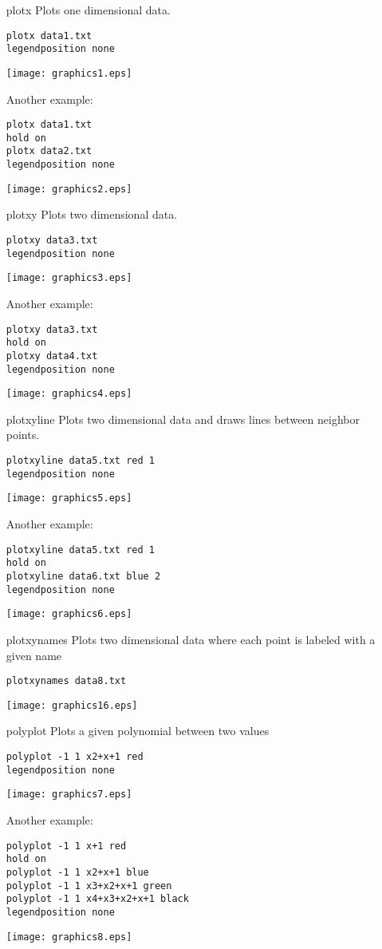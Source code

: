 \documentclass[a4paper,12pt]{book}
\begin{document}
\begin{itemize}
\item[plotx] Plots one dimensional data.
\begin{verbatim}
plotx data1.txt
legendposition none
\end{verbatim}
\texttt{[image: graphics1.eps]}

Another example:
\begin{verbatim}
plotx data1.txt
hold on
plotx data2.txt
legendposition none
\end{verbatim}
\texttt{[image: graphics2.eps]}
\item[plotxy] Plots two dimensional data.
\begin{verbatim}
plotxy data3.txt
legendposition none
\end{verbatim}
\texttt{[image: graphics3.eps]}

Another example:
\begin{verbatim}
plotxy data3.txt
hold on
plotxy data4.txt
legendposition none
\end{verbatim}
\texttt{[image: graphics4.eps]}
\item[plotxyline] Plots two dimensional data and draws lines between neighbor points.
\begin{verbatim}
plotxyline data5.txt red 1
legendposition none
\end{verbatim}
\texttt{[image: graphics5.eps]}

Another example:
\begin{verbatim}
plotxyline data5.txt red 1
hold on
plotxyline data6.txt blue 2
legendposition none
\end{verbatim}
\texttt{[image: graphics6.eps]}
\item[plotxynames] Plots two dimensional data where each point is labeled with a given name
\begin{verbatim}
plotxynames data8.txt
\end{verbatim}
\texttt{[image: graphics16.eps]}

\item[polyplot] Plots a given polynomial between two values
\begin{verbatim}
polyplot -1 1 x2+x+1 red
legendposition none
\end{verbatim}
\texttt{[image: graphics7.eps]}

Another example:
\begin{verbatim}
polyplot -1 1 x+1 red
hold on
polyplot -1 1 x2+x+1 blue
polyplot -1 1 x3+x2+x+1 green
polyplot -1 1 x4+x3+x2+x+1 black
legendposition none
\end{verbatim}
\texttt{[image: graphics8.eps]}


\end{itemize}
\end{document}

